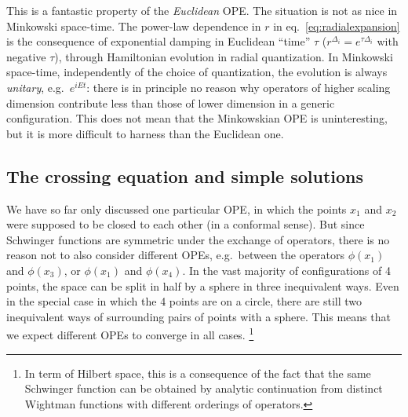 \documentclass[a4paper,12pt]{article}
\numberwithin{equation}{section}
\begin{document}
This is a fantastic property of the \emph{Euclidean} OPE. The situation is not as nice in Minkowski space-time. 
The power-law dependence in $r$ in eq.~\eqref{eq:radialexpansion} is the consequence of exponential damping in Euclidean ``time'' $\tau$ ($r^{\Delta_i} = e^{\tau \Delta_i}$ with negative $\tau$), through Hamiltonian evolution in radial quantization.
In Minkowski space-time, independently of the choice of quantization, the evolution is always \emph{unitary}, e.g.~$e^{i E t}$: there is in principle no reason why operators of higher scaling dimension contribute less than those of lower dimension in a generic configuration.
This does not mean that the Minkowskian OPE is uninteresting, but it is more difficult to harness than the Euclidean one.


\subsection{The crossing equation and simple solutions}

We have so far only discussed one particular OPE, in which the points $x_1$ and $x_2$ were supposed to be closed to each other (in a conformal sense). But since Schwinger functions are symmetric under the exchange of operators, there is no reason not to also consider different OPEs, e.g.~between the operators $\phi(x_1)$ and $\phi(x_3)$, or $\phi(x_1)$ and $\phi(x_4)$.
In the vast majority of configurations of 4 points, the space can be split in half by a sphere in three inequivalent ways. Even in the special case in which the 4 points are on a circle, there are still two inequivalent ways of surrounding pairs of points with a sphere. This means that we expect different OPEs to converge in all cases.%
%
\footnote{In term of Hilbert space, this is a consequence of the fact that the same Schwinger function can be obtained by analytic continuation from distinct Wightman functions with different orderings of operators.}
\end{document}
